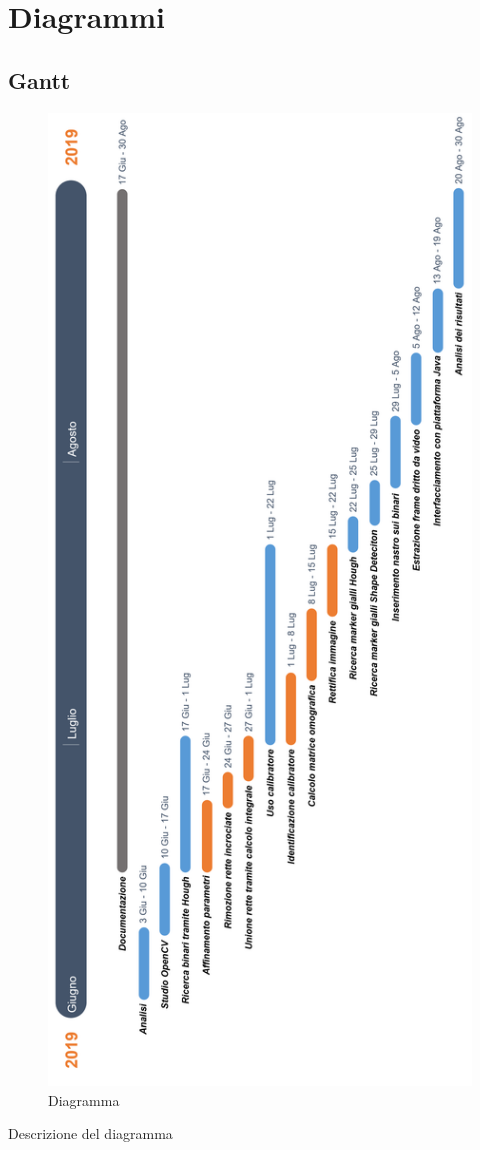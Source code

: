 \documentclass[twoside]{supsistudent}
\begin{document}
\chapter{Diagrammi}
\section{Gantt}
\begin{figure}[H]
  \center
  \includegraphics[scale=0.35]{images/Timeline.png}
  \caption{Diagramma}
\end{figure}
Descrizione del diagramma
\end{document}
